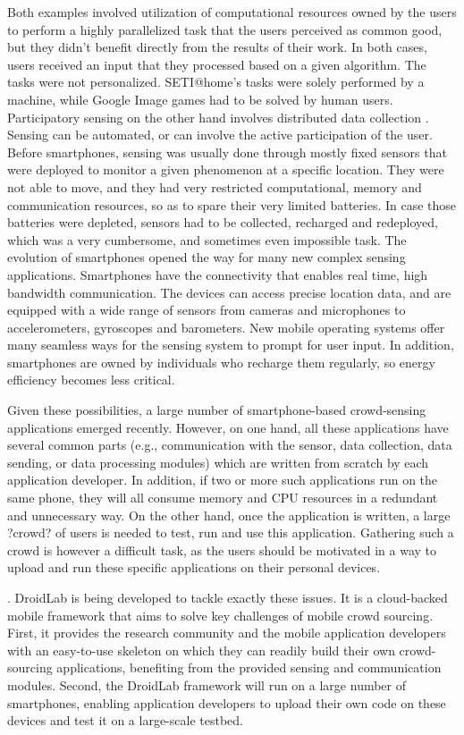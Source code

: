 \documentclass[conference,letterpaper]{IEEEtran}
\begin{document}
Both examples involved utilization of computational resources owned by the users to perform a highly parallelized task that the users perceived as common good, but they didn't benefit directly from the results of their work. In both cases, users received an input that they processed based on a given algorithm. The tasks were not personalized. SETI@home's tasks were solely performed by a machine, while Google Image games had to be solved by human users. 
Participatory sensing on the other hand involves distributed data collection . Sensing can be automated, or can involve the active participation of the user. Before smartphones, sensing was usually done through mostly fixed sensors that were deployed to monitor a given phenomenon at a specific location. They were not able to move, and they had very restricted computational, memory and communication resources, so as to spare their very limited batteries. In case those batteries were depleted, sensors had to be collected, recharged and redeployed, which was a very cumbersome, and sometimes even impossible task. The evolution of smartphones opened the way for many new complex sensing applications. Smartphones have the connectivity that enables real time, high bandwidth communication. The devices can access precise location data, and are equipped with a wide range of sensors from cameras and microphones to accelerometers, gyroscopes and barometers. New mobile operating systems offer many seamless ways for the sensing system to prompt for user input. In addition, smartphones are owned by individuals who recharge them regularly, so energy efficiency becomes less critical.

Given these possibilities, a large number of smartphone-based crowd-sensing applications emerged recently. However, on one hand, all these applications have several common parts (e.g., communication with the sensor, data collection, data sending, or data processing modules) which are written from scratch by each application developer. In addition, if two or more such applications run on the same phone, they will all consume memory and CPU resources in a redundant and unnecessary way. On the other hand, once the application is written, a large ?crowd? of users is needed to test, run and use this application. Gathering such a crowd is however a difficult task, as the users should be motivated in a way to upload and run these specific applications on their personal devices.     
 
. DroidLab is being developed to tackle exactly these issues. It  is a cloud-backed mobile framework  that aims to solve key challenges of mobile crowd sourcing. First, it provides the research community and the mobile application developers with an easy-to-use skeleton on which they can readily build their own crowd-sourcing applications, benefiting from the provided sensing and communication modules. Second, the DroidLab framework will run on a large number of smartphones, enabling application developers to upload their own code on these devices and test it on a large-scale testbed. 
\end{document}
